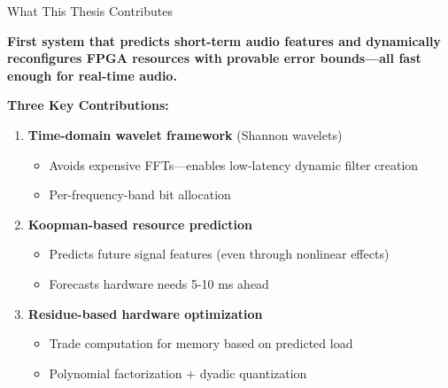 \documentclass[aspectratio=169,11pt]{beamer}
\begin{document}
\begin{frame}{What This Thesis Contributes}

\begin{tcolorbox}[colback=orange!15,colframe=orange!80,title=\textbf{Core Novelty}]
\textbf{First system that predicts short-term audio features and dynamically reconfigures FPGA resources with provable error bounds—all fast enough for real-time audio.}
\end{tcolorbox}

\vspace{0.25cm}

\textbf{Three Key Contributions:}

\begin{enumerate}
    \item \textbf{Time-domain wavelet framework} (Shannon wavelets)
    \begin{itemize}
        \item Avoids expensive FFTs—enables low-latency dynamic filter creation
        \item Per-frequency-band bit allocation
    \end{itemize}
    
    \vspace{0.15cm}
    
    \item \textbf{Koopman-based resource prediction}
    \begin{itemize}
        \item Predicts future signal features (even through nonlinear effects)
        \item Forecasts hardware needs 5-10 ms ahead
    \end{itemize}
    
    \vspace{0.15cm}
    
    \item \textbf{Residue-based hardware optimization}
    \begin{itemize}
        \item Trade computation for memory based on predicted load
        \item Polynomial factorization + dyadic quantization
    \end{itemize}
\end{enumerate}

\end{frame}
\end{document}
